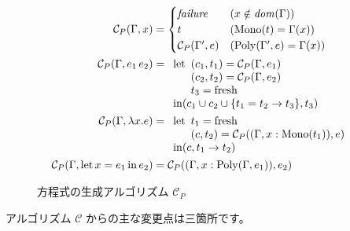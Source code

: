 \begin{figure}[htbp]
  \begin{align*}
    \mathcal C_P(\Gamma, x) &=
      \begin{cases}
        \mathit{failure}          & (x \notin \mathit{dom}(\Gamma)) \\
        t                         & (\mathrm{Mono}(t) = \Gamma(x)) \\
        \mathcal C_P(\Gamma', e) & (\mathrm{Poly}(\Gamma', e) = \Gamma(x)) \\
      \end{cases} \\
    \mathcal C_P(\Gamma, e_1 \, e_2) &=
      \begin{array}[t]{l}
        \mathrm{let}
          \begin{array}[t]{l}
            (c_1, t_1) = \mathcal C_P(\Gamma, e_1) \\
            (c_2, t_2) = \mathcal C_P(\Gamma, e_2) \\
            t_3 = \mathrm{fresh}
          \end{array} \\
        \mathrm{in} (c_1 \cup c_2 \cup \{t_1 = t_2 \to t_3\}, t_3)
      \end{array} \\
    \mathcal C_P(\Gamma, \lambda x . e) &=
      \begin{array}[t]{l}
        \mathrm{let}
          \begin{array}[t]{l}
            t_1 = \mathrm{fresh} \\
            (c, t_2) = \mathcal C_P((\Gamma, x : \mathrm{Mono}(t_1)), e)
          \end{array} \\
        \mathrm{in} (c, t_1 \to t_2)
      \end{array} \\
    \mathcal C_P(\Gamma, \mathrm{let} \, x = e_1 \, \mathrm{in} \, e_2) &=
      \mathcal C_P((\Gamma, x : \mathrm{Poly}(\Gamma, e_1)), e_2)
  \end{align*}
  \caption{方程式の生成アルゴリズム $\mathcal C_P$}
  \label{fig:algorithm-cp}
\end{figure}

アルゴリズム $\mathcal C$ からの主な変更点は三箇所です。

